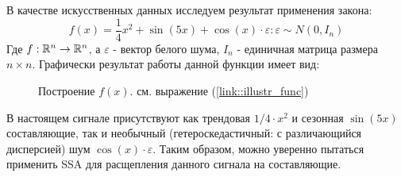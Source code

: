 \\\\
В качестве искусственных данных исследуем результат применения закона:
\begin{equation} \label{link::illustr_func}
	f(x) = \frac{1}{4}x^2 + \sin(5x) + \cos(x) \cdot \varepsilon: \varepsilon \sim N(0, I_n)
\end{equation}
Где $f: \mathbb{R}^n \to \mathbb{R}^{n}$, а $\varepsilon$ - вектор белого шума, $I_n$ - единичная матрица размера $n \times n$. Графически результат работы данной функции имеет вид:
\begin{figure}[H]
	\centering
	\caption{Построение $f(x)$. см. выражение (\ref{link::illustr_func})}
\end{figure}
В настоящем сигнале присутствуют как трендовая $1/4 \cdot x^2$ и сезонная $\sin(5x)$ составляющие, так и необычный (гетероскедастичный: с различающийся дисперсией) шум $\cos(x) \cdot \varepsilon$. Таким образом, можно уверенно пытаться применить SSA для расщепления данного сигнала на составляющие.

